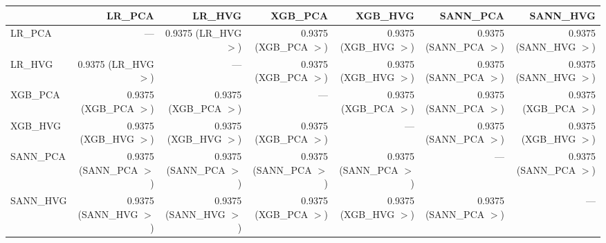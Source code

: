 \begin{tabular}{lrrrrrr}
\toprule
 & LR_PCA & LR_HVG & XGB_PCA & XGB_HVG & SANN_PCA & SANN_HVG \\
\midrule
LR_PCA & --- & 0.9375 (LR_HVG $>$) & 0.9375 (XGB_PCA $>$) & 0.9375 (XGB_HVG $>$) & 0.9375 (SANN_PCA $>$) & 0.9375 (SANN_HVG $>$) \\
LR_HVG & 0.9375 (LR_HVG $>$) & --- & 0.9375 (XGB_PCA $>$) & 0.9375 (XGB_HVG $>$) & 0.9375 (SANN_PCA $>$) & 0.9375 (SANN_HVG $>$) \\
XGB_PCA & 0.9375 (XGB_PCA $>$) & 0.9375 (XGB_PCA $>$) & --- & 0.9375 (XGB_PCA $>$) & 0.9375 (SANN_PCA $>$) & 0.9375 (XGB_PCA $>$) \\
XGB_HVG & 0.9375 (XGB_HVG $>$) & 0.9375 (XGB_HVG $>$) & 0.9375 (XGB_PCA $>$) & --- & 0.9375 (SANN_PCA $>$) & 0.9375 (XGB_HVG $>$) \\
SANN_PCA & 0.9375 (SANN_PCA $>$) & 0.9375 (SANN_PCA $>$) & 0.9375 (SANN_PCA $>$) & 0.9375 (SANN_PCA $>$) & --- & 0.9375 (SANN_PCA $>$) \\
SANN_HVG & 0.9375 (SANN_HVG $>$) & 0.9375 (SANN_HVG $>$) & 0.9375 (XGB_PCA $>$) & 0.9375 (XGB_HVG $>$) & 0.9375 (SANN_PCA $>$) & --- \\
\bottomrule
\end{tabular}